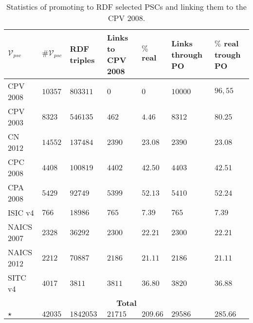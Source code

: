 \begin{table}[!htb]
\renewcommand{\arraystretch}{1.3}
\begin{center}
\begin{tabular}[c]{|p{2.2cm}|p{1.6cm}|p{1.8cm}|p{1.6cm}|p{1.6cm}|p{1.8cm}|p{1.6cm}|}
 
 \hline
  $\mathcal{V}_{psc}$ & $\#\mathcal{V}_{psc}$  & RDF triples &Links to CPV 2008 &  $\%$ real & Links through PO & $\%$ real trough PO    \\\hline

CPV 2008 	& $10357$  	& $803311$	& $0$	 	& $0$	 	& $10000$	& $96,55$	  \\ \hline
CPV 2003 	& $8323$  	& $546135$	& $462$ 	& $4.46$ 	& $8312$	& $80.25$	 \\ \hline
CN 2012  	& $14552$	& $137484$	& $2390$ 	& $23.08$	& $2390$	& $23.08$	  \\ \hline
CPC 2008 	& $4408$	& $100819$   	& $4402$	& $42.50$	& $4403$	& $42.51$ 	  \\ \hline
CPA 2008 	& $5429$	& $92749$   	& $5399$	& $52.13$	& $5410$	& $52.24$	  \\ \hline
ISIC v4  	& $766$		& $18986$   	& $765$ 	& $7.39$ 	& $765$		& $7.39$	   \\ \hline
NAICS 2007 	& $2328$	& $36292$ 	& $2300$	& $22.21$	& $2300$	& $22.21$	 \\ \hline
NAICS 2012 	& $2212$	& $70887$ 	& $2186$	& $21.11$	& $2186$	& $21.11$	  \\ \hline
SITC v4 	& $4017$	& $3811$   	& $3811$	& $36.80$	& $3820$	& $36.88$	 \\ \hline
\multicolumn{7}{|c|}{\textbf{Total}} \\ \hline
$\star$ 	& $42035$ 	& $1842053$	& $21715$   	& $209.66$	& $29586$ 	& $285.66$	 \\ \hline
\hline
  \end{tabular}
  \caption{Statistics of promoting to RDF selected PSCs and linking them to the CPV 2008.}\label{ganancia-terminos}  
  
  \end{center}
\end{table} 

